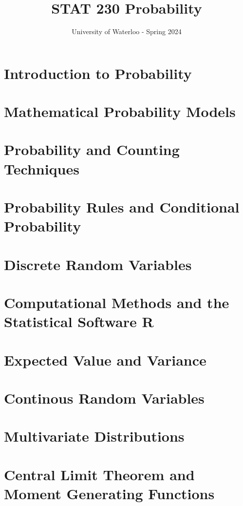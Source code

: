 \documentclass{article}
\title{STAT 230 Probability}
\author{University of Waterloo - Spring 2024}
\begin{document}
\maketitle

\tableofcontentsnewpage{}

\section{Introduction to Probability}


\section{Mathematical Probability Models}


\section{Probability and Counting Techniques}


\section{Probability Rules and Conditional Probability}


\section{Discrete Random Variables}


\section{Computational Methods and the Statistical Software R}


\section{Expected Value and Variance}


\section{Continous Random Variables}


\section{Multivariate Distributions}


\section{Central Limit Theorem and Moment Generating Functions}

\end{document}
